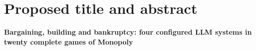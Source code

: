 %
%

\section*{Proposed title and abstract}

\noindent\textbf{Bargaining, building and bankruptcy: four configured LLM systems in twenty complete games of Monopoly}

